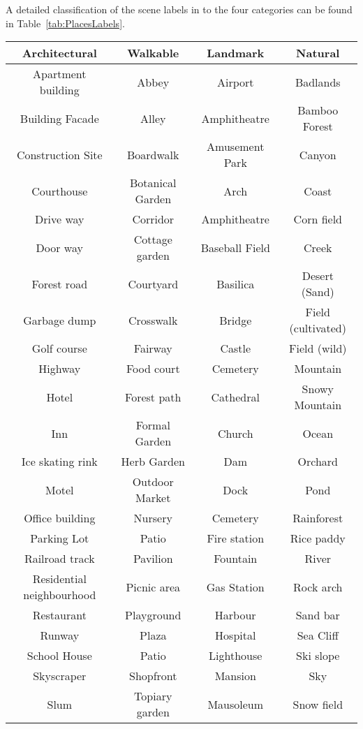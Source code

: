A detailed classification of the scene labels in to the four categories can be found in Table~\ref{tab:PlacesLabels}.
\begin{table}[htb!]
    \centering
    \begin{tabular}{ |c|c|c|c| }
        \hline
        \textbf{Architectural} & \textbf{Walkable} & \textbf{Landmark} & \textbf{Natural} \\
        \hline
        Apartment building & Abbey & Airport & Badlands\\
        Building Facade & Alley & Amphitheatre & Bamboo Forest\\
        Construction Site & Boardwalk & Amusement Park & Canyon \\
        Courthouse & Botanical Garden & Arch & Coast \\
        Drive way & Corridor & Amphitheatre & Corn field \\
        Door way & Cottage garden & Baseball Field & Creek \\
        Forest road & Courtyard & Basilica & Desert (Sand) \\
        Garbage dump & Crosswalk & Bridge & Field (cultivated)\\
        Golf course & Fairway & Castle & Field (wild)\\
        Highway & Food court & Cemetery & Mountain \\
        Hotel & Forest path & Cathedral & Snowy Mountain \\
        Inn & Formal Garden & Church & Ocean \\
        Ice skating rink & Herb Garden & Dam & Orchard \\
        Motel & Outdoor Market & Dock & Pond \\
        Office building & Nursery & Cemetery & Rainforest \\
        Parking Lot & Patio & Fire station & Rice paddy \\
        Railroad track & Pavilion & Fountain & River \\
        Residential neighbourhood & Picnic area & Gas Station & Rock arch\\
        Restaurant & Playground & Harbour & Sand bar \\
        Runway & Plaza & Hospital & Sea Cliff\\
        School House & Patio & Lighthouse & Ski slope \\
        Skyscraper & Shopfront & Mansion & Sky \\
        Slum & Topiary garden & Mausoleum & Snow field \\

\end{tabular}
\end{table}
